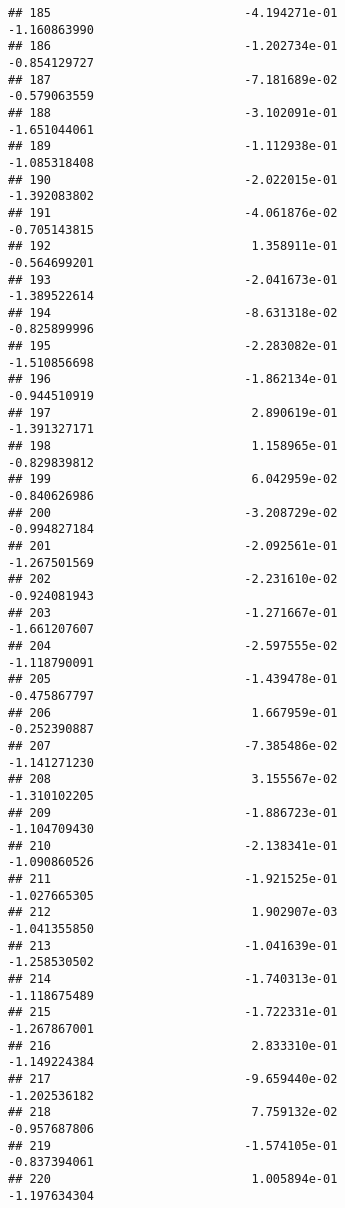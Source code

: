 \documentclass[
]{article}
\begin{document}
\begin{verbatim}
## 185                           -4.194271e-01               -1.160863990
## 186                           -1.202734e-01               -0.854129727
## 187                           -7.181689e-02               -0.579063559
## 188                           -3.102091e-01               -1.651044061
## 189                           -1.112938e-01               -1.085318408
## 190                           -2.022015e-01               -1.392083802
## 191                           -4.061876e-02               -0.705143815
## 192                            1.358911e-01               -0.564699201
## 193                           -2.041673e-01               -1.389522614
## 194                           -8.631318e-02               -0.825899996
## 195                           -2.283082e-01               -1.510856698
## 196                           -1.862134e-01               -0.944510919
## 197                            2.890619e-01               -1.391327171
## 198                            1.158965e-01               -0.829839812
## 199                            6.042959e-02               -0.840626986
## 200                           -3.208729e-02               -0.994827184
## 201                           -2.092561e-01               -1.267501569
## 202                           -2.231610e-02               -0.924081943
## 203                           -1.271667e-01               -1.661207607
## 204                           -2.597555e-02               -1.118790091
## 205                           -1.439478e-01               -0.475867797
## 206                            1.667959e-01               -0.252390887
## 207                           -7.385486e-02               -1.141271230
## 208                            3.155567e-02               -1.310102205
## 209                           -1.886723e-01               -1.104709430
## 210                           -2.138341e-01               -1.090860526
## 211                           -1.921525e-01               -1.027665305
## 212                            1.902907e-03               -1.041355850
## 213                           -1.041639e-01               -1.258530502
## 214                           -1.740313e-01               -1.118675489
## 215                           -1.722331e-01               -1.267867001
## 216                            2.833310e-01               -1.149224384
## 217                           -9.659440e-02               -1.202536182
## 218                            7.759132e-02               -0.957687806
## 219                           -1.574105e-01               -0.837394061
## 220                            1.005894e-01               -1.197634304

\end{verbatim}
\end{document}
